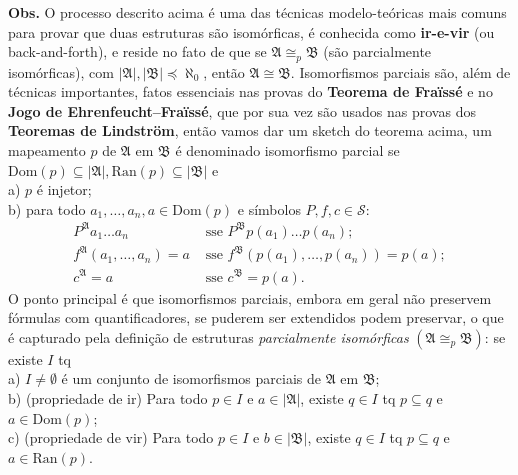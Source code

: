 \documentclass[11pt]{article}
\newcommand{\mc}[1]{\mathcal{#1}}
\newcommand{\mf}[1]{\mathfrak{#1}}
\begin{document}
\begin{shaded}
\textbf{Obs.} O processo descrito acima é uma das técnicas modelo-teóricas mais comuns para provar que duas estruturas são isomórficas, é conhecida como \textbf{ir-e-vir} (ou back-and-forth), e reside no fato de que se $\mf{A}\cong_p\mf{B}$ (são parcialmente isomórficas), com $|\mf{A}|,|\mf{B}|\preceq\aleph_0$, então $\mf{A}\cong\mf{B}$. Isomorfismos parciais são, além de técnicas importantes, fatos essenciais nas provas do \textbf{Teorema de Fraïssé} e no \textbf{Jogo de Ehrenfeucht–Fraïssé}, que por sua vez são usados nas provas dos \textbf{Teoremas de Lindström}, então vamos dar um sketch do teorema acima, um mapeamento $p$ de $\mf{A}$ em $\mf{B}$ é denominado isomorfismo parcial se $\text{Dom}(p)\subseteq|\mf{A}|,\text{Ran}(p)\subseteq|\mf{B}|$ e\\
a) $p$ é injetor;\\
b) para todo $a_1,\dots,a_n,a\in\text{Dom}(p)$ e símbolos $P,f,c\in\mc{S}$:
\begin{align*}
    P^\mf{A}a_1\dots a_n & \text{ sse }P^\mf{B}p(a_1)\dots p(a_n);\\
    f^\mf{A}(a_1,\dots,a_n)=a & \text{ sse }f^\mf{B}(p(a_1),\dots,p(a_n))=p(a);\\
    c^\mf{A}=a & \text{ sse }c^\mf{B}=p(a).
\end{align*}
O ponto principal é que isomorfismos parciais, embora em geral não preservem fórmulas com quantificadores, se puderem ser extendidos podem preservar, o que é capturado pela definição de estruturas \textit{parcialmente isomórficas} $(\mf{A}\cong_p\mf{B})$: se existe $I$ tq\\
a) $I\neq\emptyset$  é um conjunto de isomorfismos parciais de $\mf{A}$ em $\mf{B}$;\\
b) (propriedade de ir) Para todo $p\in I$ e $a\in|\mf{A}|$, existe $q\in I$ tq $p\subseteq q$ e $a\in\text{Dom}(p)$;\\
c) (propriedade de vir) Para todo $p\in I$ e $b\in|\mf{B}|$, existe $q\in I$ tq $p\subseteq q$ e $a\in\text{Ran}(p)$.\\

\end{shaded}
\end{document}
